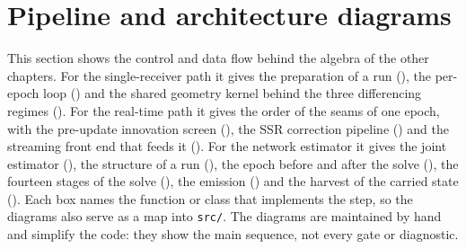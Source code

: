 \documentclass[main.tex]{subfiles}
\begin{document}
\section{Pipeline and architecture diagrams}\label{sec:diagrams}
\newcommand{\Wmat}{\bm{W}}  %
%
%
%

This section shows the control and data flow behind the algebra of the other
chapters. For the single-receiver path it gives the preparation of a run
(), the per-epoch loop () and the
shared geometry kernel behind the three differencing regimes
(). For the real-time path it gives the order of the
seams of one epoch, with the pre-update innovation screen
(), the SSR correction pipeline ()
and the streaming front end that feeds it (). For the
network estimator it gives the joint estimator (), the
structure of a run (), the epoch before and after the solve
(), the fourteen stages of the solve
(), the emission () and the harvest of
the carried state (). Each box names the function or
class that implements the step, so the diagrams also serve as a map into
\texttt{src/}. The diagrams are maintained by hand and simplify the code: they
show the main sequence, not every gate or diagnostic.
\end{document}
